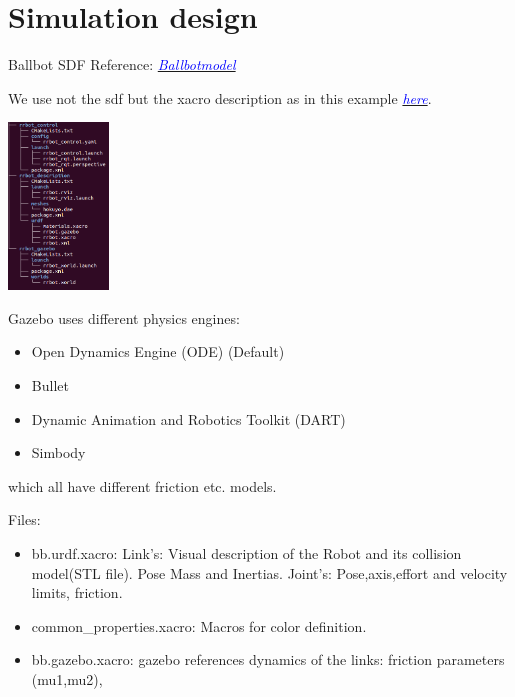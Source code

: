 \documentclass[twoside,colorback,accentcolor=tud4c,11pt]{tudreport}
\newcommand{\mylink}[2] {	\href{#1}{	\textit{\textcolor{blue}{#2}}}}
\begin{document}
\section{Simulation design}

Ballbot SDF Reference:
\mylink{https://bitbucket.org/osrf/gazebo/issues/2335/how-to-set-the-friction-of-ballbot-the}{Ballbotmodel} 

We use not the sdf but the xacro description as in this example \mylink{http://gazebosim.org/tutorials/?tut=ros_urdf}{here}.

\begin{center}
		\includegraphics[width=0.2\textwidth]{img/filestructure.png} 
\end{center}

Gazebo uses different physics engines:\\
\begin{itemize}
	\item Open Dynamics Engine (ODE) (Default)
	\item Bullet
	\item Dynamic Animation and Robotics Toolkit (DART)
	\item Simbody
\end{itemize}
 which all have different friction etc. models.

Files:
\begin{itemize}
	\item bb.urdf.xacro: Link's: Visual description of the Robot and its collision model(STL file). Pose Mass and Inertias. Joint's: Pose,axis,effort and velocity limits, friction.
	\item common\_properties.xacro: Macros for color definition.
	\item bb.gazebo.xacro: gazebo references dynamics of the links: friction parameters (mu1,mu2), 
\end{itemize}
\end{document}
